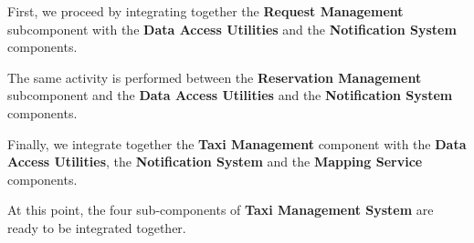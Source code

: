 First, we proceed by integrating together the \textbf{Request Management} subcomponent with the \textbf{Data Access Utilities} and the \textbf{Notification System} components.
\begin{figure}[H]
\centering
{}
\end{figure}
The same activity is performed between the \textbf{Reservation Management} subcomponent and the \textbf{Data Access Utilities} and the \textbf{Notification System} components.
\begin{figure}[H]
\centering
{}
\end{figure}
Finally, we integrate together the \textbf{Taxi Management} component with the \textbf{Data Access Utilities}, the \textbf{Notification System} and the \textbf{Mapping Service} components.
\begin{figure}[H]
\centering
{}
\end{figure}
At this point, the four sub-components of \textbf{Taxi Management System} are ready to be integrated together.
\begin{figure}[H]
\centering
{}
\end{figure}
